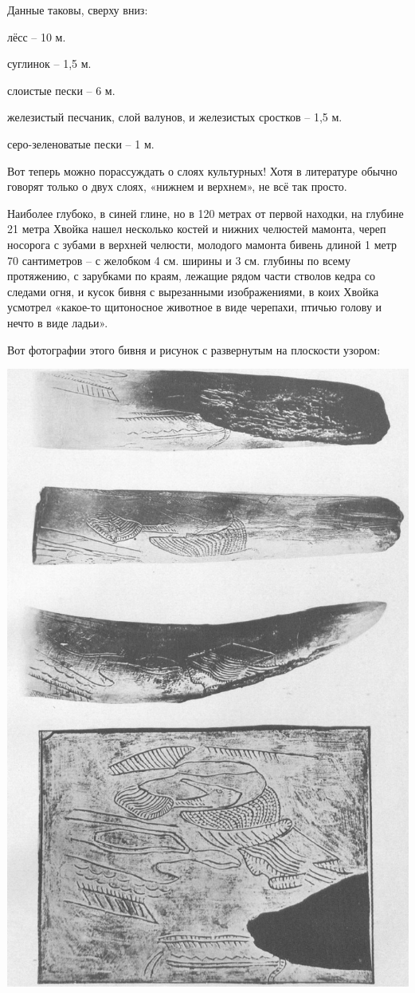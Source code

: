 Данные таковы, сверху вниз:

лёсс – 10 м.

суглинок – 1,5 м.

слоистые пески – 6 м.

железистый песчаник, слой валунов, и железистых сростков – 1,5 м.

серо-зеленоватые пески – 1 м.

Вот теперь можно порассуждать о слоях культурных! Хотя в литературе обычно говорят только о двух слоях, «нижнем и верхнем», не всё так просто.

Наиболее глубоко, в синей глине, но в 120 метрах от первой находки, на глубине 21 метра Хвойка нашел несколько костей и нижних челюстей мамонта, череп носорога с зубами в верхней челюсти, молодого мамонта бивень длиной 1 метр 70 сантиметров – с желобком 4 см. ширины и 3 см. глубины по всему протяжению, с зарубками по краям, лежащие рядом части стволов кедра со следами огня, и кусок бивня с вырезанными изображениями, в коих Хвойка усмотрел «какое-то щитоносное животное в виде черепахи, птичью голову и нечто в виде ладьи».

\newpage

Вот фотографии этого бивня и рисунок с развернутым на плоскости узором:

\begin{center}
\includegraphics[width=\linewidth]{chast-kirvys/kirstoy/1893-hvoyka-biven-01.jpg}
\end{center}

